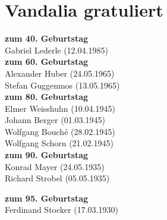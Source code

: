 \section*{Vandalia gratuliert}

{\footnotesize

\begin{multicols}{2}
	




\textbf{zum 40. Geburtstag}\\
Gabriel Lederle (12.04.1985)
\\







\textbf{zum 60. Geburtstag} \\
Alexander Huber (24.05.1965)\\
Stefan Guggenmos (13.05.1965)\\








\textbf{zum 80. Geburtstag}\\
Elmer Weisshuhn (10.04.1945)\\
Johann Berger (01.03.1945)\\
Wolfgang Bouché (28.02.1945)\\
Wolfgang Schorn (21.02.1945)\\




\textbf{zum 90. Geburtstag}\\
Konrad Mayer (24.05.1935)\\
Richard  Strobel (05.05.1935)\\

\columnbreak

\textbf{zum 95. Geburtstag}\\
Ferdinand Stocker (17.03.1930) \\



\end{multicols}}
